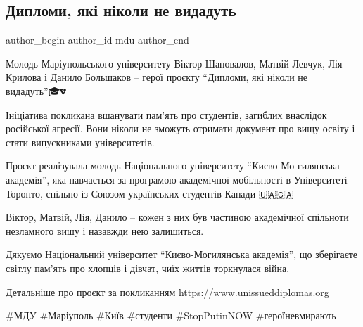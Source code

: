  
 
 
 
 

\subsection{Дипломи, які ніколи не видадуть}
\label{sec:03_07_2023.fb.mdu.1.dyplomy_jaki_nikoly_ne_vydadjut}

\ifcmt
 author_begin
   author_id mdu
 author_end
\fi

Молодь Маріупольського університету Віктор Шаповалов, Матвій Левчук, Лія
Крилова і Данило Большаков – герої проєкту \enquote{Дипломи, які ніколи не
видадуть}🎓💔

Ініціатива покликана вшанувати пам'ять про студентів, загиблих внаслідок
російської агресії. Вони ніколи не зможуть отримати документ про вищу освіту і
стати випускниками університетів. 

Проєкт реалізувала молодь Національного університету \enquote{Києво-Мо\hyp гилянська
академія}, яка навчається за програмою академічної мобільності в Університеті
Торонто, спільно із Союзом українських студентів Канади 🇺🇦🇨🇦

Віктор, Матвій, Лія, Данило – кожен з них був частиною академічної спільноти
незламного вишу і назавжди нею залишиться.

Дякуємо Національний університет \enquote{Києво-Могилянська академія}, що зберігаєте
світлу пам'ять про хлопців і дівчат, чиїх життів торкнулася війна. 

Детальніше про проєкт за покликанням \url{https://www.unissueddiplomas.org}

\#МДУ \#Маріуполь \#Київ \#студенти \#StopPutinNOW \#героїневмирають
